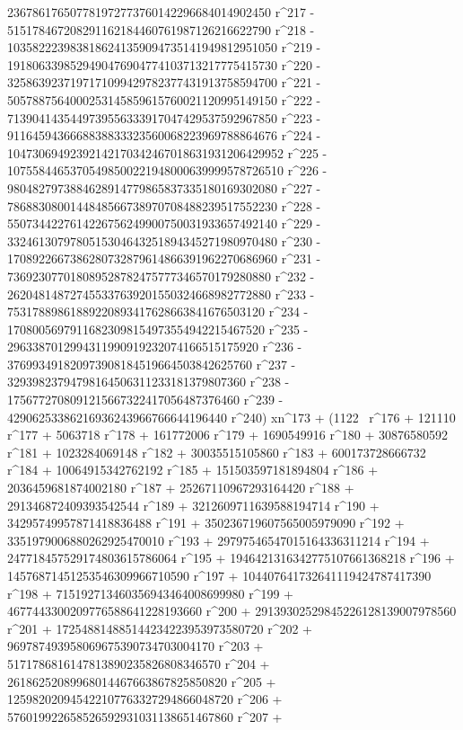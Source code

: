        236786176507781972773760142296684014902450 r^217 - 
       515178467208291162184460761987126216622790 r^218 - 
       1035822239838186241359094735141949812951050 r^219 - 
       1918063398529490476904774103713217775415730 r^220 - 
       3258639237197171099429782377431913758594700 r^221 - 
       5057887564000253145859615760021120995149150 r^222 - 
       7139041435449739556333917047429537592967850 r^223 - 
       9116459436668838833323560068223969788864676 r^224 - 
       10473069492392142170342467018631931206429952 r^225 - 
       10755844653705498500221948000639999578726510 r^226 - 
       9804827973884628914779865837335180169302080 r^227 - 
       7868830800144848566738970708488239517552230 r^228 - 
       5507344227614226756249900750031933657492140 r^229 - 
       3324613079780515304643251894345271980970480 r^230 - 
       1708922667386280732879614866391962270686960 r^231 - 
       736923077018089528782475777346570179280880 r^232 - 
       262048148727455337639201550324668982772880 r^233 - 
       75317889861889220893417628663841676503120 r^234 - 
       17080056979116823098154973554942215467520 r^235 - 
       2963387012994311990919232074166515175920 r^236 - 
       376993491820973908184519664503842625760 r^237 - 
       32939823794798164506311233181379807360 r^238 - 
       1756772708091215667322417056487376460 r^239 - 
       42906253386216936243966766644196440 r^240) xn^173 + (1122 \
r^176 + 121110 r^177 + 5063718 r^178 + 161772006 r^179 + 
       1690549916 r^180 + 30876580592 r^181 + 1023284069148 r^182 + 
       30035515105860 r^183 + 600173728666732 r^184 + 
       10064915342762192 r^185 + 151503597181894804 r^186 + 
       2036459681874002180 r^187 + 25267110967293164420 r^188 + 
       291346872409393542544 r^189 + 3212609711639588194714 r^190 + 
       34295749957871418836488 r^191 + 
       350236719607565005979090 r^192 + 
       3351979006880262925470010 r^193 + 
       29797546547015164336311214 r^194 + 
       247718457529174803615786064 r^195 + 
       1946421316342775107661368218 r^196 + 
       14576871451253546309966710590 r^197 + 
       104407641732641119424787417390 r^198 + 
       715192713460356943464008699980 r^199 + 
       4677443300209776588641228193660 r^200 + 
       29139302529845226128139007978560 r^201 + 
       172548814885144234223953973580720 r^202 + 
       969787493958069675390734703004170 r^203 + 
       5171786816147813890235826808346570 r^204 + 
       26186252089968014467663867825850820 r^205 + 
       125982020945422107763327294866048720 r^206 + 
       576019922658526592931031138651467860 r^207 + 
